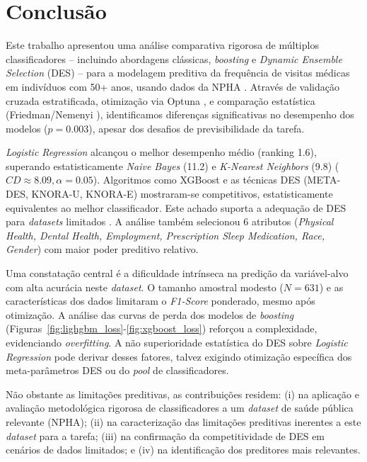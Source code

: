 \documentclass[12pt]{article}
\begin{document}
\section{Conclusão}
Este trabalho apresentou uma análise comparativa rigorosa de múltiplos classificadores – incluindo abordagens clássicas, \textit{boosting} e \textit{Dynamic Ensemble Selection} (DES) – para a modelagem preditiva da frequência de visitas médicas em indivíduos com 50+ anos, usando dados da NPHA \cite{NPHA2017}. Através de validação cruzada estratificada, otimização via Optuna \cite{akiba2019optuna}, e comparação estatística (Friedman/Nemenyi \cite{demsarStatistical}), identificamos diferenças significativas no desempenho dos modelos ($p=0.003$), apesar dos desafios de previsibilidade da tarefa.

\textit{Logistic Regression} alcançou o melhor desempenho médio (ranking 1.6), superando estatisticamente \textit{Naive Bayes} (11.2) e \textit{K-Nearest Neighbors} (9.8) ($CD \approx 8.09, \alpha=0.05$). Algoritmos como XGBoost e as técnicas DES (META-DES, KNORA-U, KNORA-E) mostraram-se competitivos, estatisticamente equivalentes ao melhor classificador. Este achado suporta a adequação de DES para \textit{datasets} limitados \cite{Cruz_2015, ICPRAI2018SI}. A análise também selecionou 6 atributos (\textit{Physical Health, Dental Health, Employment, Prescription Sleep Medication, Race, Gender}) com maior poder preditivo relativo.

Uma constatação central é a dificuldade intrínseca na predição da variável-alvo com alta acurácia neste \textit{dataset}. O tamanho amostral modesto ($N=631$) e as características dos dados limitaram o \textit{F1-Score} ponderado, mesmo após otimização. A análise das curvas de perda dos modelos de \textit{boosting} (Figuras~\ref{fig:lighgbm_loss}-\ref{fig:xgboost_loss}) reforçou a complexidade, evidenciando \textit{overfitting}. A não superioridade estatística do DES sobre \textit{Logistic Regression} pode derivar desses fatores, talvez exigindo otimização específica dos meta-parâmetros DES ou do \textit{pool} de classificadores.

Não obstante as limitações preditivas, as contribuições residem: (i) na aplicação e avaliação metodológica rigorosa de classificadores a um \textit{dataset} de saúde pública relevante (NPHA); (ii) na caracterização das limitações preditivas inerentes a este \textit{dataset} para a tarefa; (iii) na confirmação da competitividade de DES em cenários de dados limitados; e (iv) na identificação dos preditores mais relevantes.
\end{document}
